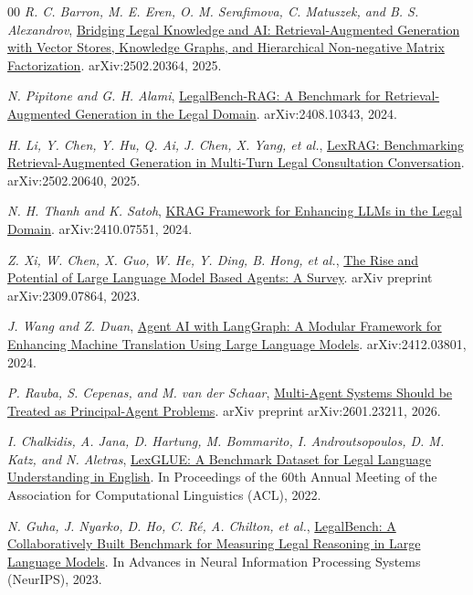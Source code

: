 \documentclass[3p,times,procedia]{elsarticle}
\begin{document}
\begin{thebibliography}{00}
\textit{R. C. Barron, M. E. Eren, O. M. Serafimova, C. Matuszek, and B. S. Alexandrov},
\href{https://doi.org/10.48550/arxiv.2502.20364}{Bridging Legal Knowledge and AI: Retrieval-Augmented Generation with Vector Stores, Knowledge Graphs, and Hierarchical Non-negative Matrix Factorization}. arXiv:2502.20364, 2025.

\textit{N. Pipitone and G. H. Alami},
\href{https://doi.org/10.48550/arxiv.2408.10343}{LegalBench-RAG: A Benchmark for Retrieval-Augmented Generation in the Legal Domain}. arXiv:2408.10343, 2024.

\textit{H. Li, Y. Chen, Y. Hu, Q. Ai, J. Chen, X. Yang, et al.},
\href{https://doi.org/10.48550/arxiv.2502.20640}{LexRAG: Benchmarking Retrieval-Augmented Generation in Multi-Turn Legal Consultation Conversation}. arXiv:2502.20640, 2025.

\textit{N. H. Thanh and K. Satoh},
\href{https://doi.org/10.48550/arxiv.2410.07551}{KRAG Framework for Enhancing LLMs in the Legal Domain}. arXiv:2410.07551, 2024.

\textit{Z. Xi, W. Chen, X. Guo, W. He, Y. Ding, B. Hong, et al.},
\href{https://arxiv.org/abs/2309.07864}{The Rise and Potential of Large Language Model Based Agents: A Survey}. arXiv preprint arXiv:2309.07864, 2023.

\textit{J. Wang and Z. Duan},
\href{https://doi.org/10.48550/arxiv.2412.03801}{Agent AI with LangGraph: A Modular Framework for Enhancing Machine Translation Using Large Language Models}. arXiv:2412.03801, 2024.

\textit{P. Rauba, S. Cepenas, and M. van der Schaar},
\href{https://arxiv.org/abs/2601.23211}{Multi-Agent Systems Should be Treated as Principal-Agent Problems}. arXiv preprint arXiv:2601.23211, 2026.

\textit{I. Chalkidis, A. Jana, D. Hartung, M. Bommarito, I. Androutsopoulos, D. M. Katz, and N. Aletras},
\href{https://aclanthology.org/2022.acl-long.297/}{LexGLUE: A Benchmark Dataset for Legal Language Understanding in English}. In Proceedings of the 60th Annual Meeting of the Association for Computational Linguistics (ACL), 2022.

\textit{N. Guha, J. Nyarko, D. Ho, C. R{\'e}, A. Chilton, et al.},
\href{https://papers.neurips.cc/paper_files/paper/2023/hash/89e44582fd28ddfea1ea4dcb0ebbf4b0-Abstract-Datasets_and_Benchmarks.html}{LegalBench: A Collaboratively Built Benchmark for Measuring Legal Reasoning in Large Language Models}. In Advances in Neural Information Processing Systems (NeurIPS), 2023.

\end{thebibliography}
\end{document}
